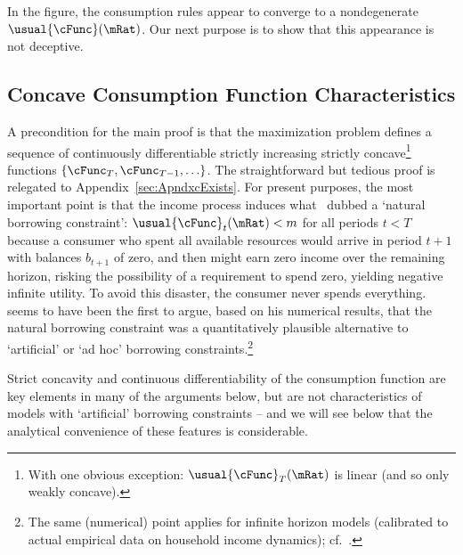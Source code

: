 \documentclass[BufferStockTheory]{subfiles}
\begin{document}
\hypertarget{\figFile}{}
\hypertarget{\figName}{}

In the figure, the consumption rules appear to converge to a nondegenerate $\usual{\cFunc}(\mRat)$.
Our next purpose is to show that this appearance is not deceptive.  \hypertarget{Concave-Consumption-Function-Characteristics}{}

\subsection{Concave Consumption Function Characteristics}\label{sec:cExists}

A precondition for the main proof is that the maximization problem defines a sequence of continuously differentiable strictly increasing strictly concave\footnote{With one obvious exception: $\usual{\cFunc}_{T}(\mRat)$ is linear (and so only weakly concave).} functions $\{\cFunc_{T},\cFunc_{T-1},\ldots\}$.  The straightforward but tedious proof is relegated to Appendix~\ref{sec:ApndxcExists}.  For present purposes, the most important point is that the income process induces what~\cite{aiyagari:ge} dubbed a `natural borrowing constraint':  $\usual{\cFunc}_{t}(\mRat) < m$ for all periods $t < T$ because a consumer who spent all available resources would arrive in period $t+1$ with balances $b_{t+1}$ of zero, and then might earn zero income over the remaining horizon, risking the possibility of a requirement to spend zero, yielding negative infinite utility.  To avoid this disaster, the consumer never spends everything.~~\cite{zeldesStochastic} seems to have been the first to argue, based on his numerical results, that the natural borrowing constraint was a quantitatively plausible alternative to `artificial' or `ad hoc' borrowing constraints.\footnote{The same (numerical) point applies for infinite horizon models (calibrated to actual empirical data on household income dynamics); cf.~\cite{carrollBrookings}.}

Strict concavity and continuous differentiability of the consumption function are key elements in many of the arguments below, but are not characteristics of models with `artificial' borrowing constraints -- and we will see below that the analytical convenience of these features is considerable.%
\end{document}
